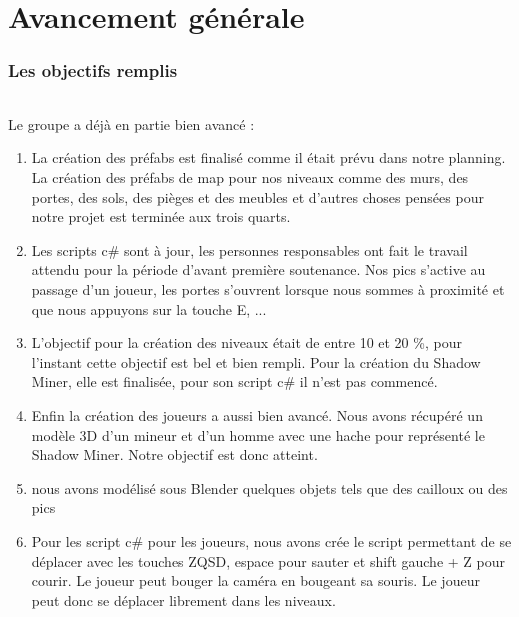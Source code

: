 \documentclass[titlepage, 13px, a4paper]{article}
\begin{document}
\newpage

\part{Avancement générale}  
\section{Les objectifs remplis} 
\paragraph{} \hspace{0pt} 
Le groupe a déjà en partie bien avancé :
{\begin{enumerate}
	\item La création des préfabs est finalisé comme il était prévu dans notre planning. \\
		La création des préfabs de map pour nos niveaux comme des murs,
		des portes, des sols, des pièges et des meubles et d'autres choses pensées pour notre projet est terminée aux trois quarts.
		\\
	\item Les scripts c\# sont à jour, les personnes responsables ont fait le travail attendu pour la période d'avant première soutenance.
		Nos pics s'active au passage d'un joueur, les portes s'ouvrent lorsque nous sommes à proximité et que nous appuyons sur la touche E, ...
		\\
	\item L'objectif pour la création des niveaux était de entre 10 et 20 \%, pour l'instant cette objectif est bel et bien rempli.
			Pour la création du Shadow Miner, elle est finalisée, pour son script c\# il n'est pas commencé.
		\\
	\item Enfin la création des joueurs a aussi bien avancé.
		Nous avons récupéré un modèle 3D d'un mineur et d'un homme avec une hache pour représenté le Shadow Miner.
		Notre objectif  est donc atteint. 
		\\
	\item nous avons modélisé sous Blender quelques objets tels que des cailloux ou des pics 
		\\
	\item Pour les script c\# pour les joueurs, nous avons crée le script permettant de se déplacer avec les touches ZQSD, espace pour sauter et shift gauche + Z pour courir.
		Le joueur peut bouger la caméra en bougeant sa souris. Le joueur peut donc se déplacer librement dans les niveaux.

\end{enumerate}}
\end{document}
